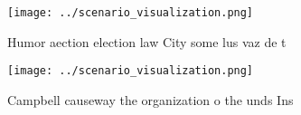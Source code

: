 \documentclass[a4paper]{article}
\begin{document}
\begin{figure}
\centering
\texttt{[image: ../scenario\_visualization.png]}
\caption{Humor aection election law City some lus vaz de t
}
\end{figure}
 
\begin{figure}
\centering
\texttt{[image: ../scenario\_visualization.png]}
\caption{Campbell causeway the organization o the unds Ins
}
\end{figure}
 
\end{document}

